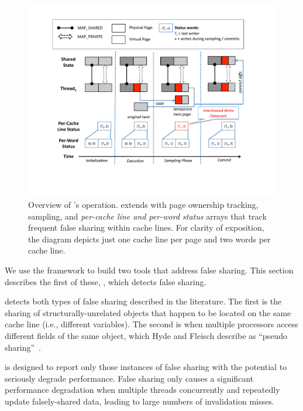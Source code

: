 

\begin{figure}[!t]
\centering
\includegraphics[width=6in]{figure/sheriffdetective}
\caption{
Overview of \sheriffdetect{}'s operation.
\sheriffdetect{} extends \sheriff{} with page ownership tracking, sampling,
and  \emph{per-cache line and per-word status} arrays
that track frequent false sharing
within cache lines. For clarity of exposition, the diagram depicts just one cache line per page and two words per cache line.
\label{fig:detectiveoverview}}
\end{figure}

\label{sec:falseshare}

We use the \sheriff{} framework to build two
tools that address false sharing. This section
describes the first of these, \sheriffdetect{}, which detects false sharing.

\sheriffdetect{} detects both types of false sharing described in
the literature. The first is the sharing of structurally-unrelated
objects that happen to be located on the same cache line (i.e.,
different variables). The second is when multiple processors access
different fields of the same object, which Hyde and Fleisch describe
as ``pseudo sharing''~\cite{falseshare:Analysis}.

\sheriffdetect{} is designed to report only those instances of false sharing with
the potential to seriously degrade performance. False sharing
only causes a significant performance degradation when multiple threads
concurrently and repeatedly update falsely-shared data, leading to
large numbers of invalidation misses.

